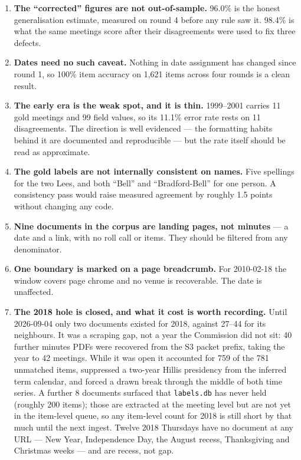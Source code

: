 \documentclass[11pt]{article}
\begin{document}
\begin{enumerate}
\item \textbf{The ``corrected'' figures are not out-of-sample.} 96.0\% is the honest
generalisation estimate, measured on round 4 before any rule saw it. 98.4\% is what the same
meetings score after their disagreements were used to fix three defects.
\item \textbf{Dates need no such caveat.} Nothing in date assignment has changed since round
1, so 100\% item accuracy on 1{,}621 items across four rounds is a clean result.
\item \textbf{The early era is the weak spot, and it is thin.} 1999--2001 carries 11 gold
meetings and 99 field values, so its 11.1\% error rate rests on 11 disagreements. The
direction is well evidenced --- the formatting habits behind it are documented and
reproducible --- but the rate itself should be read as approximate.
\item \textbf{The gold labels are not internally consistent on names.} Five spellings for
the two Lees, and both ``Bell'' and ``Bradford-Bell'' for one person. A consistency pass
would raise measured agreement by roughly 1.5 points without changing any code.
\item \textbf{Nine documents in the corpus are landing pages, not minutes} --- a date and a
link, with no roll call or items. They should be filtered from any denominator.
\item \textbf{One boundary is marked on a page breadcrumb.} For 2010-02-18 the window covers
page chrome and no venue is recoverable. The date is unaffected.
\item \textbf{The 2018 hole is closed, and what it cost is worth recording.} Until
2026-09-04 only two documents existed for 2018, against 27--44 for its neighbours. It was a
scraping gap, not a year the Commission did not sit: 40 further minutes PDFs were recovered
from the S3 packet prefix, taking the year to 42 meetings. While it was open it accounted
for 759 of the 781 unmatched items, suppressed a two-year Hillis presidency from the
inferred term calendar, and forced a drawn break through the middle of both time series.
A further 8 documents surfaced that \texttt{labels.db} has never held (roughly 200 items);
those are extracted at the meeting level but are not yet in the item-level queue, so any
item-level count for 2018 is still short by that much until the next ingest. Twelve 2018
Thursdays have no document at any URL --- New Year, Independence Day, the August recess,
Thanksgiving and Christmas weeks --- and are recess, not gap.

\end{enumerate}
\end{document}
